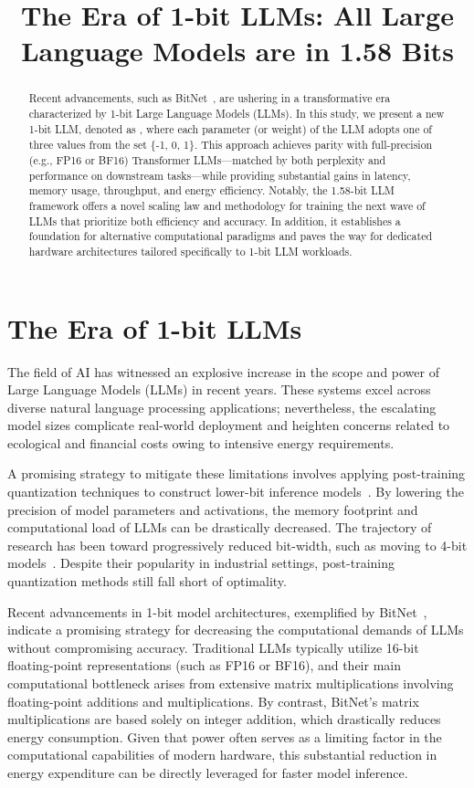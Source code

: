 \title{The Era of 1-bit LLMs: All Large Language Models are in 1.58 Bits}

\begin{abstract}
Recent advancements, such as BitNet~\cite{bitnet}, are ushering in a transformative era characterized by 1-bit Large Language Models (LLMs). In this study, we present a new 1-bit LLM, denoted as \textbf{}, where each parameter (or weight) of the LLM adopts one of three values from the set \{-1, 0, 1\}. This approach achieves parity with full-precision (e.g., FP16 or BF16) Transformer LLMs—matched by both perplexity and performance on downstream tasks—while providing substantial gains in latency, memory usage, throughput, and energy efficiency. Notably, the 1.58-bit LLM framework offers a novel scaling law and methodology for training the next wave of LLMs that prioritize both efficiency and accuracy. In addition, it establishes a foundation for alternative computational paradigms and paves the way for dedicated hardware architectures tailored specifically to 1-bit LLM workloads.
\end{abstract}

\section{The Era of 1-bit LLMs}

The field of AI has witnessed an explosive increase in the scope and power of Large Language Models (LLMs) in recent years. These systems excel across diverse natural language processing applications; nevertheless, the escalating model sizes complicate real-world deployment and heighten concerns related to ecological and financial costs owing to intensive energy requirements.

A promising strategy to mitigate these limitations involves applying post-training quantization techniques to construct lower-bit inference models~\cite{smoothquant, gptq, quip, quip_sharp}. By lowering the precision of model parameters and activations, the memory footprint and computational load of LLMs can be drastically decreased. The trajectory of research has been toward progressively reduced bit-width, such as moving to 4-bit models~\cite{gptq, awq}. Despite their popularity in industrial settings, post-training quantization methods still fall short of optimality.

Recent advancements in 1-bit model architectures, exemplified by BitNet~\cite{bitnet}, indicate a promising strategy for decreasing the computational demands of LLMs without compromising accuracy. Traditional LLMs typically utilize 16-bit floating-point representations (such as FP16 or BF16), and their main computational bottleneck arises from extensive matrix multiplications involving floating-point additions and multiplications. By contrast, BitNet’s matrix multiplications are based solely on integer addition, which drastically reduces energy consumption. Given that power often serves as a limiting factor in the computational capabilities of modern hardware, this substantial reduction in energy expenditure can be directly leveraged for faster model inference.

